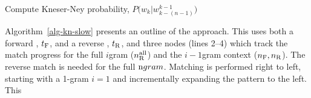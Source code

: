 \begin{algorithm*}[p]
  \caption{Compute Kneser-Ney probability, $P\big(w_k | w^{k-1}_{k-(n-1)}\big)$
    \label{alg:pkn}}
  \begin{algorithmic}[1]
        \Let{$\nf$}{$\rooot{\tf}$} 
        \Let{$\nr$}{$\rooot{\tr}$} 
        \Let{$\nrfull$}{$\rooot{\tr}$} 
           
          \EndIf
          \EndIf
          \Else
              
           \EndIf
              
                    
               \EndIf
          \EndIf
        \EndFor
      \State {}
    \EndFunction
  \end{algorithmic}
\label{alg-kn-slow}
\end{algorithm*}

\afterpage{\clearpage}

Algorithm~\ref{alg-kn-slow} presents an outline of the approach.
This uses both a forward \CST, $t_{\text{F}}$, and a reverse \CST, $t_{\text{R}}$, and three \CST nodes (lines 2--4) which track the match progress for the full $i$gram ($\nrfull$) and the $i-1$gram context ($n_{\text{F}}, n_{\text{R}}$).
The reverse match is needed for the full $\ngram$. 
Matching is performed right to left, starting with a 1-gram $i=1$ and incrementally expanding the pattern to the left. 
This 


